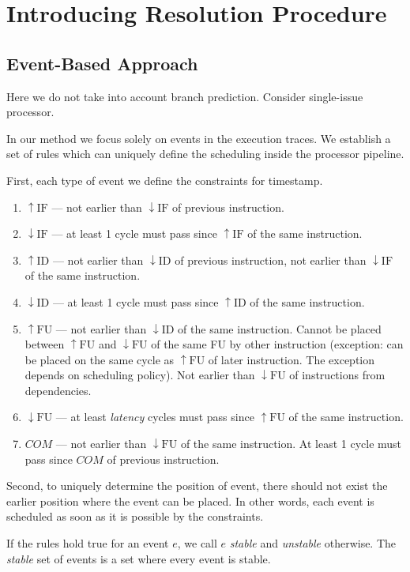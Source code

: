 \documentclass[12pt, a4paper]{memoir} %
\newcommand{\IFa}{\uparrow\mathrm{IF}}
\newcommand{\IFr}{\downarrow\mathrm{IF}}
\newcommand{\IDa}{\uparrow\mathrm{ID}}
\newcommand{\IDr}{\downarrow\mathrm{ID}}
\newcommand{\FUa}{\uparrow\mathrm{FU}}
\newcommand{\FUr}{\downarrow\mathrm{FU}}
\newcommand{\TODO}[1]{}
\begin{document}
\section{Introducing Resolution Procedure}

\subsection{Event-Based Approach}

\TODO{input: known latencies}

Here we do not take into account branch prediction. Consider single-issue processor.

In our method we focus solely on events in the execution traces. We establish a set of rules which can uniquely define the scheduling inside the processor pipeline.

First, each type of event we define the constraints for timestamp.
\begin{enumerate}
    \item $\IFa$ --- not earlier than $\IFr$ of previous instruction.
    \item $\IFr$ --- at least 1 cycle must pass since $\IFa$ of the same instruction.
    \item $\IDa$ --- not earlier than $\IDr$ of previous instruction, not earlier than $\IFr$ of the same instruction.
    \item $\IDr$ --- at least 1 cycle must pass since $\IDa$ of the same instruction.
    \item $\FUa$ --- not earlier than $\IDr$ of the same instruction. Cannot be placed between $\FUa$ and $\FUr$ of the same FU by other instruction (exception: can be placed on the same cycle as $\FUa$ of later instruction. The exception depends on scheduling policy). Not earlier than $\FUr$ of instructions from dependencies.
    \item $\FUr$ --- at least \textit{latency} cycles must pass since $\FUa$ of the same instruction.
    \item $COM$ --- not earlier than $\FUr$ of the same instruction. At least 1 cycle must pass since $COM$ of previous instruction.
\end{enumerate}

Second, to uniquely determine the position of event, there should not exist the earlier position where the event can be placed. In other words, each event is scheduled as soon as it is possible by the constraints.

If the rules hold true for an event $e$, we call $e$ \textit{stable} and \textit{unstable} otherwise. The \textit{stable} set of events is a set where every event is stable.
\end{document}
